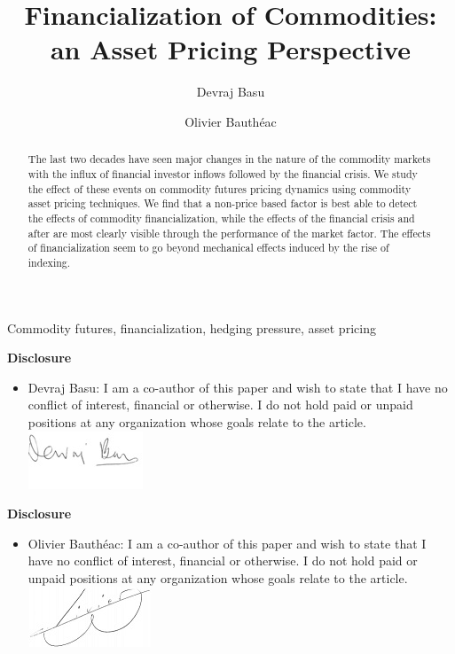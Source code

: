 \documentclass[]{elsarticle} %
\makeatletter
\providecommand{\tightlist}{%
  \setlength{\itemsep}{0pt}\setlength{\parskip}{0pt}}
\def\maxwidth{\ifdim\Gin@nat@width>\linewidth\linewidth
\else\Gin@nat@width\fi}
\let\Oldincludegraphics\includegraphics
\renewcommand{\includegraphics}[1]{\Oldincludegraphics[width=\maxwidth]{#1}}
\makeatother
\begin{document}
\begin{frontmatter}

  \title{Financialization of Commodities: an Asset Pricing Perspective}
    \author[strathclyde]{Devraj Basu}
  
    \author[strathclyde]{Olivier Bauthéac}
  
      \address[strathclyde]{University of Strathclyde, Glasgow, UK}
  
  \begin{abstract}
  The last two decades have seen major changes in the nature of the
  commodity markets with the influx of financial investor inflows followed
  by the financial crisis. We study the effect of these events on
  commodity futures pricing dynamics using commodity asset pricing
  techniques. We find that a non-price based factor is best able to detect
  the effects of commodity financialization, while the effects of the
  financial crisis and after are most clearly visible through the
  performance of the market factor. The effects of financialization seem
  to go beyond mechanical effects induced by the rise of indexing.
  \end{abstract}
   \begin{keyword} Commodity futures, financialization, hedging pressure, asset pricing\end{keyword}
 \end{frontmatter}

\newpage

\textbf{Disclosure}

\begin{itemize}
\tightlist
\item
  Devraj Basu: I am a co-author of this paper and wish to state that I
  have no conflict of interest, financial or otherwise. I do not hold
  paid or unpaid positions at any organization whose goals relate to the
  article.\\
  \includegraphics{Devraj.jpg}
\end{itemize}

\newpage

\textbf{Disclosure}

\begin{itemize}
\tightlist
\item
  Olivier Bauthéac: I am a co-author of this paper and wish to state
  that I have no conflict of interest, financial or otherwise. I do not
  hold paid or unpaid positions at any organization whose goals relate
  to the article.\\
  \includegraphics{Olivier.jpg}
\end{itemize}
\end{document}
